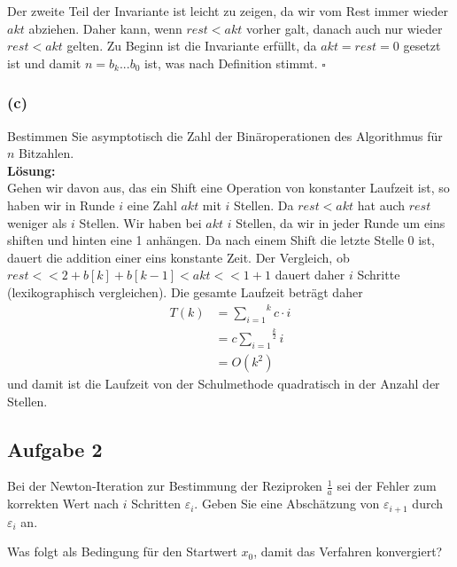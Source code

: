 \documentclass[11pt,a4paper,ngerman]{article}
\begin{document}
Der zweite Teil der Invariante ist leicht zu zeigen, da wir vom Rest immer wieder $akt$ abziehen. Daher kann, wenn $rest < akt$ vorher galt,
danach auch nur wieder $rest<akt$ gelten. Zu Beginn ist die Invariante erfüllt, da $akt = rest = 0$ gesetzt ist und damit
$n = b_k ... b_0$ ist, was nach Definition stimmt.
\mbox{} \hfill $\square$
\subsubsection*{(c)}

Bestimmen Sie asymptotisch die Zahl der Binäroperationen des Algorithmus für $n$ Bitzahlen.\\

\textbf{Lösung:}\\

Gehen wir davon aus, das ein Shift eine Operation von konstanter Laufzeit ist, so
haben wir in Runde $i$ eine Zahl $akt$ mit $i$ Stellen. Da $rest < akt$ hat auch $rest$ weniger als $i$ Stellen.
Wir haben bei $akt$ $i$ Stellen, da wir in jeder Runde um eins shiften und hinten eine 1 anhängen. Da nach einem Shift
die letzte Stelle 0 ist, dauert die addition einer eins konstante Zeit.
Der Vergleich, ob $rest<<2 +b[k] + b[k-1] <  akt << 1 + 1$ dauert daher $i$ Schritte (lexikographisch vergleichen).
Die gesamte Laufzeit beträgt daher
\begin{equation}\begin{split}
    T(k) &= \overset{k}{\underset{i=1}{\sum}} c \cdot i\\
        &= c \overset{\frac{k}{2}}{\underset{i=1}{\sum}} i\\
        &= O (k^2)
\end{split}\end{equation}
und damit ist die Laufzeit von der Schulmethode quadratisch in der Anzahl der Stellen.
\subsection*{Aufgabe 2}

Bei der Newton-Iteration zur Bestimmung der Reziproken $\frac{1}{a}$ sei der Fehler zum korrekten Wert nach $i$ Schritten $\varepsilon_i$. Geben Sie eine Abschätzung von $\varepsilon_{i+1}$ durch $\varepsilon_i$ an.

Was folgt als Bedingung für den Startwert $x_0$, damit das Verfahren konvergiert?\\
\end{document}
